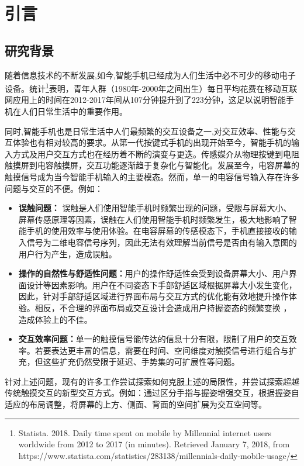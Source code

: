 \chapter{引言}
\label{cha:intro}

\section{研究背景}
随着信息技术的不断发展,如今,智能手机已经成为人们生活中必不可少的移动电子设备。统计\footnote{Statista. 2018. Daily time spent on mobile by Millennial internet users worldwide from 2012 to 2017 (in minutes). Retrieved January 7, 2018, from https://www.statista.com/statistics/283138/millennials-daily-mobile-usage/ }表明，青年人群（1980年-2000年之间出生）每日平均花费在移动互联网应用上的时间在2012-2017年间从107分钟提升到了223分钟，这足以说明智能手机在人们日常生活中的重要作用。

同时,智能手机也是日常生活中人们最频繁的交互设备之一,对交互效率、性能与交互体验也有相对较高的要求。从第一代按键式手机的出现开始至今，智能手机的输入方式及用户交互方式也在经历着不断的演变与更迭。传感媒介从物理按键到电阻触摸屏到电容触摸屏，交互功能逐渐趋于复杂化与智能化。发展至今，电容屏幕的触摸信号成为当今智能手机输入的主要模态。然而，单一的电容信号输入存在许多问题与交互的不便。例如：

\begin{itemize}
    \item \textbf{误触问题：} 误触是人们使用智能手机时频繁出现的问题，受限与屏幕大小、屏幕传感原理等因素，误触在人们使用智能手机时频繁发生，极大地影响了智能手机的使用效率与使用体验。在电容屏幕的传感模态下，手机直接接收的输入信号为二维电容信号序列，因此无法有效理解当前信号是否由有输入意图的用户行为产生，造成误触。
    \item \textbf{操作的自然性与舒适性问题：}用户的操作舒适性会受到设备屏幕大小、用户界面设计等因素影响。用户在不同姿态下手部舒适区域根据屏幕大小发生变化\cite{Le:2018:FRC:3173574.3173605}，因此，针对手部舒适区域进行界面布局与交互方式的优化能有效地提升操作体验。相反，不合理的界面布局或交互设计会造成用户持握姿态的频繁变换\cite{Eardley:2017:UGS:3025453.3025835} ，造成体验上的不佳。
    \item \textbf{交互效率问题：}单一的触摸信号能传达的信息十分有限，限制了用户的交互效率。若要表达更丰富的信息，需要在时间、空间维度对触摸信号进行组合与扩充，但这些扩充仍然受限于延迟、手势集的可扩展性等问题\cite{Chen:2014:AIT:2642918.2647392}。
\end{itemize}

针对上述问题，现有的许多工作尝试探索如何克服上述的局限性，并尝试探索超越传统触摸交互的新型交互方式。例如：通过区分手指与握姿增强交互\cite{Masson:2017:WIF:3126594.3126619}\cite{Lim:2016:WAR:2957265.2961857}，根据握姿自适应的布局调整\cite{Lim:2016:WAR:2957265.2961857}\cite{Cheng:2013:IAS:2470654.2481424}，将屏幕的上方\cite{Chen:2014:AIT:2642918.2647392}\cite{Hasan:2016:TST:2983310.2985755}\cite{Hinckley:2016:PSM:2858036.2858095}、侧面\cite{Chang2006Recognition}\cite{Cheng:2013:IAS:2470654.2481424}\cite{Cheng:2013:IGA:2468356.2479514}、背面\cite{Corsten:2017:BUB:3025453.3025565}\cite{Wong:2016:BBO:2999508.2999522}的空间扩展为交互空间等。

